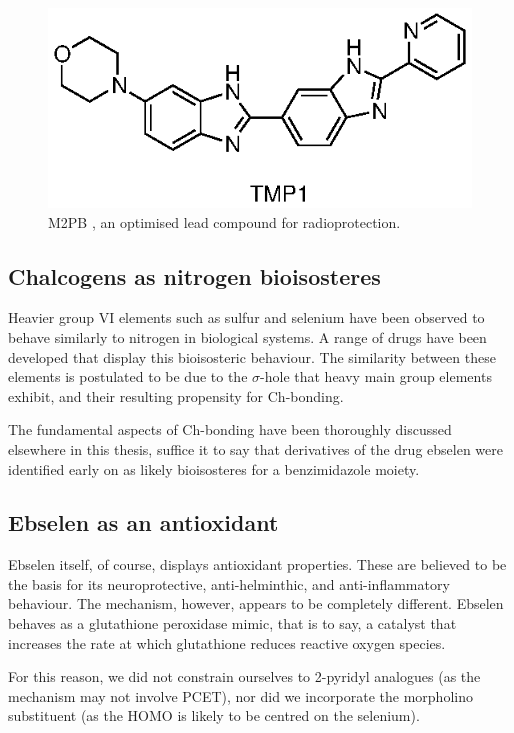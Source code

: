\begin{refsection}
\begin{figure}
\includegraphics[scale=0.74]{Figures/m2pb.eps}
\caption{M2PB , an optimised lead compound for radioprotection.}\label{fig:m2pb}
\end{figure}


\subsection{Chalcogens as nitrogen bioisosteres}
Heavier group VI elements such as sulfur and selenium have been observed to behave similarly to nitrogen in biological systems.
A range of drugs have been developed that display this bioisosteric behaviour\autocite{Beno2015}.
The similarity between these elements is postulated to be due to the $\sigma$-hole that heavy main group elements exhibit, and their resulting propensity for Ch-bonding.

The fundamental aspects of Ch-bonding have been thoroughly discussed elsewhere in this thesis, suffice it to say that derivatives of the drug ebselen  were identified early on as likely bioisosteres for a benzimidazole moiety.


\subsection{Ebselen as an antioxidant}\label{sec:simplification}
Ebselen itself, of course, displays antioxidant properties.
These are believed to be the basis for its neuroprotective, anti-helminthic, and anti-inflammatory behaviour.
The mechanism, however, appears to be completely different.
Ebselen behaves as a glutathione peroxidase mimic, that is to say, a catalyst that increases the rate at which glutathione reduces reactive oxygen species.

For this reason, we did not constrain ourselves to 2-pyridyl analogues (as the mechanism may not involve PCET), nor did we incorporate the morpholino substituent (as the HOMO is likely to be centred on the selenium).


\end{refsection}
